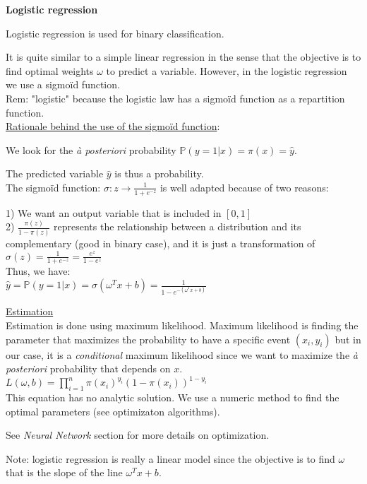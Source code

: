 {\fontsize{12pt}{22pt} \textbf{Logistic regression}\par}

\vspace{5mm}

Logistic regression is used for binary classification.

It is quite similar to a simple linear regression in the sense that the objective is to find optimal weights $\omega$ to predict a variable. However, in the logistic regression we use a sigmoïd function.\\

Rem: "logistic" because the logistic law has a sigmoïd function as a repartition function.\\

\underline{Rationale behind the use of the sigmoïd function}:

We look for the \textit{à posteriori} probability $\mathbb{P}(y=1 | x) = \pi (x) = \hat{y}$.

The predicted variable $\hat{y}$ is thus a probability.  \\

The sigmoïd function: $\sigma: z \to \frac{1}{1+e^{-z}}$ is well adapted because of two reasons:

1) We want an output variable that is included in $[0,1]$ \\
2) $\frac{\pi(z)}{1-\pi(z)}$ represents the relationship between a distribution and its complementary (good in binary case), and it is just a transformation of $\sigma(z)=\frac{1}{1+e^{-z}}=\frac{e^z}{1-e^z}$ \\

Thus, we have: \\
$\hat{y} = \mathbb{P}(y=1 | x) = \sigma(\omega ^Tx + b) = \frac{1}{1-e^{-(\omega ^Tx + b)}}$

\vspace{5mm}

\underline{Estimation} \\
Estimation is done using maximum likelihood. Maximum likelihood is finding the parameter that maximizes the probability to have a specific event $(x_i, y_i)$ but in our case, it is a \textit{conditional} maximum likelihood since we want to maximize the \textit{à posteriori} probability that depends on $x$. \\

$L(\omega, b) = \prod_{i=1}^n \pi(x_i)^{y_i}(1-\pi(x_i))^{1-y_i}$ \\

This equation has no analytic solution. We use a numeric method to find the optimal parameters (see optimizaton algorithms).

See \textit{Neural Network} section for more details on optimization.

\vspace{5mm}

Note: logistic regression is really a linear model since the objective is to find $\omega$ that is the slope of the line $\omega ^Tx + b$.

\vspace{5mm}